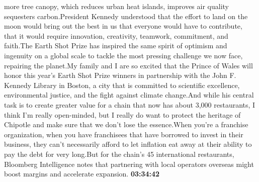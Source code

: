 \documentclass{article}%
\begin{document}
more tree canopy, which reduces urban heat islands, improves air quality sequesters carbon.President Kennedy understood that the effort to land on the moon would bring out the best in us that everyone would have to contribute, that it would require innovation, creativity, teamwork, commitment, and faith.The Earth Shot Prize has inspired the same spirit of optimism and ingenuity on a global scale to tackle the most pressing challenge we now face, repairing the planet.My family and I are so excited that the Prince of Wales will honor this year's Earth Shot Prize winners in partnership with the John F. Kennedy Library in Boston, a city that is committed to scientific excellence, environmental justice, and the fight against climate change.And while his central task is to create greater value for a chain that now has about 3,000 restaurants, I think I'm really open{-}minded, but I really do want to protect the heritage of Chipotle and make sure that we don't lose the essence.When you're a franchise organization, when you have franchisees that have borrowed to invest in their business, they can't necessarily afford to let inflation eat away at their ability to pay the debt for very long.But for the chain's 45 international restaurants, Bloomberg Intelligence notes that partnering with local operators overseas might boost margins and accelerate expansion.%
\textbf{03:34:42}%
\newline%
\end{document}
